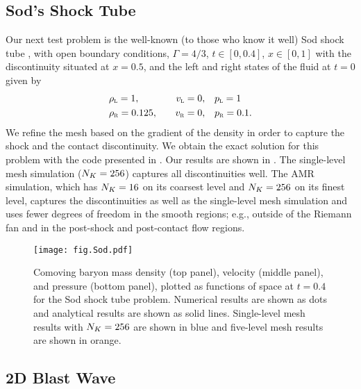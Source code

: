 \subsection{Sod's Shock Tube}

Our next test problem is the well-known (to those who know it well)
Sod shock tube \citep{s1978},
with open boundary conditions,
$\Gamma=4/3$,
$t\in\left[0,0.4\right]$,
$x\in\left[0,1\right]$ with the discontinuity situated at $x=0.5$,
and the left and right states of the fluid at $t=0$ given by
\begin{alignat*}{3}
  &\rho_{\textsc{l}}=1,\hspace{1em}
  &v_{\textsc{l}}=0,\hspace{1em}
  &p_{\textsc{l}}=1 \\
  &\rho_{\textsc{r}}=0.125,\hspace{1em}
  &v_{\textsc{r}}=0,\hspace{1em}
  &p_{\textsc{r}}=0.1.
\end{alignat*}
We refine the mesh based on the gradient of the density in order to capture
the shock and the contact discontinuity.
We obtain the exact solution for this problem with the code presented
in \citet{mm2003}.
Our results are shown in .
The single-level mesh simulation ($N_{K}=256$) captures all discontinuities well.
The AMR simulation, which has $N_{K}=16$ on its coarsest level and $N_{K}=256$
on its finest level, captures the discontinuities as well as the single-level
mesh simulation and uses fewer degrees of freedom in the smooth regions; e.g.,
outside of the Riemann fan and in the post-shock and post-contact flow regions.
\begin{figure}[htb!]
  \centering
  \texttt{[image: fig.Sod.pdf]}
  \caption{
Comoving baryon mass density (top panel),
velocity (middle panel),
and pressure (bottom panel),
plotted as functions of space at $t=0.4$ for the Sod shock tube problem.
Numerical results are shown as dots and
analytical results are shown as solid lines.
Single-level mesh results with $N_{K}=256$ are shown in blue
and five-level mesh results are shown in orange.}
  \label{fig.Sod}
\end{figure}

\subsection{2D Blast Wave}

